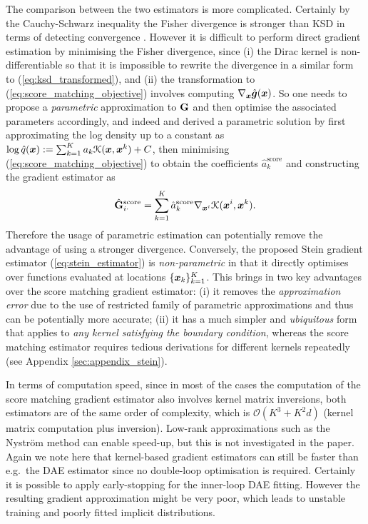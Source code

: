 The comparison between the two estimators is more complicated. Certainly by the Cauchy-Schwarz inequality the Fisher divergence is stronger than KSD in terms of detecting convergence \citep{liu:ksd2016}. However it is difficult to perform direct gradient estimation by minimising the Fisher divergence, since (i) the Dirac kernel is non-differentiable so that it is impossible to rewrite the divergence in a similar form to (\ref{eq:ksd_transformed}), and (ii) the transformation to (\ref{eq:score_matching_objective}) involves computing $\nabla_{\bm{x}} \hat{\bm{g}}(\bm{x})$. So one needs to propose a \emph{parametric} approximation to $\mathbf{G}$ and then optimise the associated parameters accordingly, and indeed \cite{sasaki:gradient2014} and \cite{strathmann:kmc2015} derived a parametric solution by first approximating the log density up to a constant as
$\log \hat{q}(\bm{x}) := \sum_{k=1}^K a_k \mathcal{K}(\bm{x}, \bm{x}^k) + C$,
then minimising (\ref{eq:score_matching_objective}) to obtain the coefficients $\hat{a}^{\text{score}}_k$ and constructing the gradient estimator as
\begin{equation}
\hat{\mathbf{G}}^{\text{score}}_{i\cdot} = \sum_{k=1}^{K} \hat{a}^{\text{score}}_k \nabla_{\bm{x}^i} \mathcal{K}(\bm{x}^i, \bm{x}^k).
\label{eq:grad_parametric_estimator}
\end{equation}
%
Therefore the usage of parametric estimation can potentially remove the advantage of using a stronger divergence. Conversely, the proposed Stein gradient estimator (\ref{eq:stein_estimator}) is \emph{non-parametric} in that it directly optimises over functions evaluated at locations $\{ \bm{x}_k \}_{k=1}^K$. 
%
This brings in two key advantages over the score matching gradient estimator: (i) it removes the \emph{approximation error} due to the use of restricted family of parametric approximations and thus can be potentially more accurate; (ii) it has a much simpler and \emph{ubiquitous} form that applies to \emph{any kernel satisfying the boundary condition}, whereas the score matching estimator requires tedious derivations for different kernels repeatedly (see Appendix \ref{sec:appendix_stein}). 

In terms of computation speed, since in most of the cases the computation of the score matching gradient estimator also involves kernel matrix inversions, both estimators are of the same order of complexity, which is $\mathcal{O}(K^3 + K^2 d)$ (kernel matrix computation plus inversion). Low-rank approximations such as the Nystr\"om method \citep{smola:sparse2000, williams:kernel2001} can enable speed-up, but this is not investigated in the paper. Again we note here that kernel-based gradient estimators can still be faster than e.g.~the DAE estimator since no double-loop optimisation is required. Certainly it is possible to apply early-stopping for the inner-loop DAE fitting. However the resulting gradient approximation might be very poor, which leads to unstable training and poorly fitted implicit distributions.

